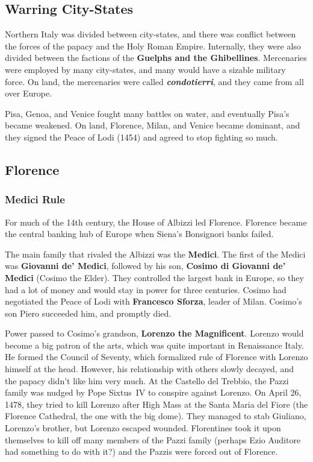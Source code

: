 \subsection*{Warring City-States}

Northern Italy was divided between city-states,
and there was conflict between the forces of the papacy and the Holy Roman Empire.
Internally, they were also divided between the factions of the \textbf{Guelphs and the Ghibellines}.
Mercenaries were employed by many city-states, and many would have a sizable military force.
On land, the mercenaries were called \textit{\textbf{condotierri}}, and they came from all over Europe.

Pisa, Genoa, and Venice fought many battles on water, and eventually Pisa's became weakened.
On land, Florence, Milan, and Venice became dominant,
and they signed the Peace of Lodi (1454) and agreed to stop fighting so much.

\subsection*{Florence}

\subsubsection*{Medici Rule}

For much of the 14th century, the House of Albizzi led Florence.
Florence became the central banking hub of Europe when Siena's Bonsignori banks failed.

The main family that rivaled the Albizzi was the \textbf{Medici}.
The first of the Medici was \textbf{Giovanni de' Medici},
followed by his son, \textbf{Cosimo di Giovanni de' Medici} (Cosimo the Elder).
They controlled the largest bank in Europe,
so they had a lot of money and would stay in power for three centuries.
Cosimo had negotiated the Peace of Lodi with \textbf{Francesco Sforza}, leader of Milan.
Cosimo's son Piero succeeded him, and promptly died.

Power passed to Cosimo's grandson, \textbf{Lorenzo the Magnificent}.
Lorenzo would become a big patron of the arts, which was quite important in Renaissance Italy.
He formed the Council of Seventy, which formalized rule of Florence with Lorenzo himself at the head.
However, his relationship with others slowly decayed, and the papacy didn't like him very much.
At the Castello del Trebbio, the Pazzi family was nudged by Pope Sixtus~IV to conspire against Lorenzo.
On April 26, 1478, they tried to kill Lorenzo after High Mass at the Santa Maria del Fiore
(the Florence Cathedral, the one with the big dome).
They managed to stab Giuliano, Lorenzo's brother, but Lorenzo escaped wounded.
Florentines took it upon themselves to kill off many members of the Pazzi family
(perhaps Ezio Auditore had something to do with it?)
and the Pazzis were forced out of Florence.

